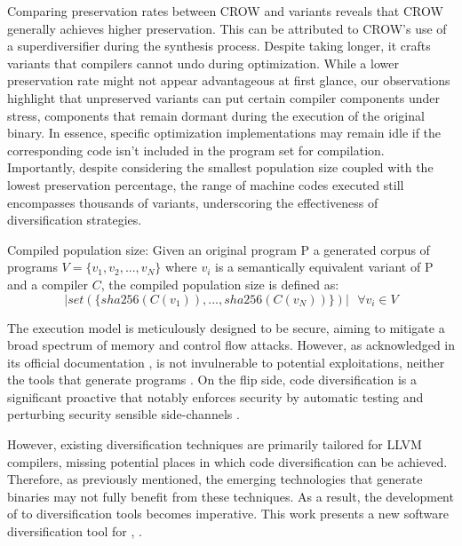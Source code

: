 Comparing preservation rates between CROW and \tool variants reveals that CROW generally achieves higher preservation. 
This can be attributed to CROW's use of a superdiversifier during the synthesis process. 
Despite taking longer, it crafts variants that compilers cannot undo during optimization. 
While a lower preservation rate might not appear advantageous at first glance, our observations highlight that unpreserved variants can put certain compiler components under stress, components that remain dormant during the execution of the original binary. 
In essence, specific optimization implementations may remain idle if the corresponding code isn't included in the \wasm program set for compilation. 
Importantly, despite considering the smallest population size coupled with the lowest preservation percentage, the range of machine codes executed still encompasses thousands of variants, underscoring the effectiveness of diversification strategies.




\begin{metric}{Compiled population size:}\label{metric:popcomp}
Given an original \wasm program P a generated corpus of \wasm programs $V=\{v_1, v_2, ..., v_N\}$ where $v_i$ is a semantically equivalent variant of P and a compiler $C$, the compiled population size is defined as:
$$
    | set(\{ sha256(C(v_1)),..., sha256(C(v_N)) \})|\text{ } \forall v_i \in V 
$$

\end{metric}



The \wasm execution model is meticulously designed to be secure, aiming to mitigate a broad spectrum of memory and control flow attacks.
However, as acknowledged in its official documentation \cite{WebAssemblySecurity}, \wasm is not invulnerable to potential exploitations, neither the tools that generate \Wasm programs \cite{usenixWASM2020, stievenart2021security}.
On the flip side, code diversification is a significant proactive that notably enforces security by automatic testing and perturbing security sensible side-channels \cite{arteaga2020crow, MEWE, CABRERAARTEAGA2023103296}.


However, existing diversification techniques are primarily tailored for LLVM compilers, missing potential places in which code diversification can be achieved.
Therefore, as previously mentioned, the emerging technologies that generate \wasm binaries may not fully benefit from these techniques.
As a result, the development of \Wasm to \Wasm diversification tools becomes imperative.
This work presents a new software diversification tool for \Wasm, \tool.


